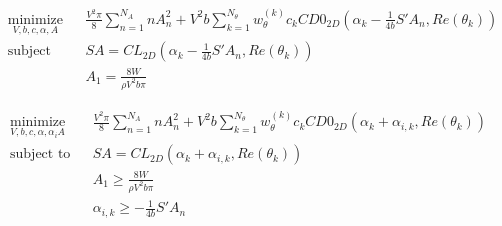 \documentclass[letterpaper,12pt]{article}
\begin{document}
\begin{align}
	& \underset{V, b, c, \alpha, A}{\text{minimize}}
	& & \frac{V^2 \pi}{8}\sum_{n=1}^{N_A} n A_{n}^2 +
	  V^2 b  \sum_{k=1}^{N_{\theta}} w_{\theta}^{(k)} c_k CD0_{2D}\left( 
		\alpha_k - \frac {1}{4b} S' A_n, Re(\theta_k)
		\right) \label{obj1} \\
	& \text{subject to}
	& & SA = CL_{2D} \left( \alpha_k - \frac {1}{4b} S' A_n , Re(\theta_k)\right)  \label{llcon1}\\
	& &  & A_1 = \frac{8W}{\rho V^2 b \pi} \label{wcon1}
\end{align}


\begin{align}
	& \underset{V, b, c, \alpha, \alpha_i A}{\text{minimize}}
	& & \frac{V^2 \pi}{8}\sum_{n=1}^{N_A} n A_{n}^2 +
	  V^2 b  \sum_{k=1}^{N_{\theta}} w_{\theta}^{(k)} c_k CD0_{2D}\left( 
		\alpha_k +\alpha_{i,k}, Re(\theta_k)
		\right) \label{obj2} \\
	& \text{subject to}
	& & SA = CL_{2D} \left( \alpha_k + \alpha_{i,k} , Re(\theta_k)\right)  \label{llcon1}\\
	& &  & A_1 \geq \frac{8W}{\rho V^2 b \pi} \label{wcon2}\\
	& &  & \alpha_{i,k}\geq - \frac {1}{4b} S' A_n \label{aindcon2}
\end{align}
\end{document}
